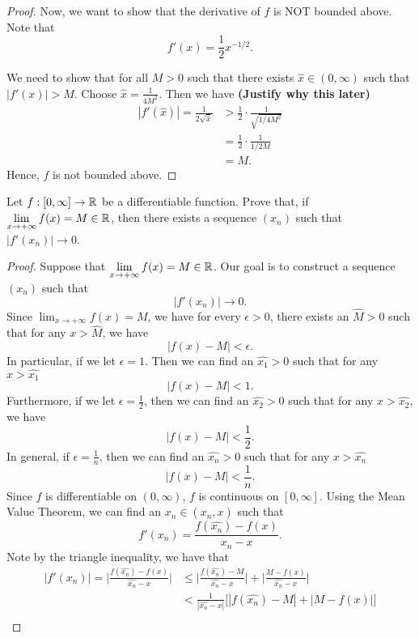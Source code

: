 \documentclass[a4paper]{article}
\begin{document}
\begin{proof}
        Now, we want to show that the derivative of \( f  \) is NOT bounded above. Note that 
        \[  f'(x) = \frac{ 1 }{ 2 }  x^{-1/2}. \]
        
        We need to show that for all \( M > 0  \) such that there exists \( \hat{x} \in (0,\infty ) \) such that \( | f'(x) |  > M  \). Choose \( \hat{x} = \frac{ 1 }{ 4 M^{2} }  \). Then we have  \textbf{(Justify why this later)} 
        \begin{align*}
            | f'(\hat{x}) | = \frac{ 1 }{ 2 \sqrt{ \hat{x} }  } &> \frac{ 1 }{ 2 }  \cdot \frac{ 1  }{  \sqrt{  1/4 M^{2} }  }  \\
                                                                &= \frac{ 1 }{ 2 } \cdot \frac{ 1 }{ 1/2M } \\ 
                                                                &= M.
        \end{align*}
        Hence, \( f  \) is not bounded above.
\end{proof}

\begin{problem}
    Let \( f: [0,\infty ] \to \mathbb{R} \) be a differentiable function. Prove that, if \( \lim_{ x \to  + \infty   }  f(x) = M  \in \R  \), then there exists a sequence \( ({x}_{n}) \) such that \( | f'({x}_{n}) | \to 0 \).
\end{problem}
\begin{proof}
Suppose that \( \lim_{ x \to + \infty   }  f(x) = M  \in \R  \). Our goal is to construct a sequence \( ({x}_{n}) \) such that 
\[  | f'({x}_{n}) | \to 0. \]
Since \( \lim_{ x \to + \infty   }  f(x) = M   \), we have for every \( \epsilon > 0  \), there exists an \( \hat{M} > 0   \) such that for any \( x > \hat{M}  \), we have
\[  | f(x) - M  | < \epsilon.  \]
In particular, if we let \( \epsilon = 1  \). Then we can find an \( \hat{{x}_{1}} > 0  \) such that for any \( x > \hat{{x}_{1}} \)
\[  | f(x) - M  | < 1. \] 
Furthermore, if we let \( \epsilon = \frac{ 1 }{ 2 }  \), then we can find an \( \hat{{x}_{2}} > 0  \) such that for any \( x > \hat{{x}_{2}} \), we have 
\[  | f(x) - M  | < \frac{ 1 }{ 2 }. \]
In general, if \( \epsilon = \frac{ 1 }{ n }  \), then we can find an \( \hat{{x}_{n}} > 0  \) such that for any \( x > \hat{{x}_{n}} \)
\[ | f(x) - M  | < \frac{ 1 }{ n }.   \] 
Since \( f  \) is differentiable on \( (0,\infty ) \), \( f  \) is continuous on \( [ 0,\infty ] \). Using the Mean Value Theorem, we can find an \( {x}_{n} \in (\hat{{x}_{n}}, x) \) such that  
\[  f'({x}_{n}) = \frac{ f(\hat{{x}_{n}}) - f(x) }{ \hat{{x}_{n}} - x   }.  \]
Note by the triangle inequality, we have that 
\begin{align*}
    | f'({x}_{n}) | = \Big| \frac{ f(\hat{{x}_{n}}) - f(x) }{ \hat{{x}_{n}} - x  }  \Big|  
                    &\leq \Big| \frac{ f(\hat{{x}_{n}}) - M  }{ \hat{{x}_{n}} - x   }  \Big| + \Big|  \frac{M - f(x)}{ \hat{{x}_{n}} - x  }  \Big| \\
                    &< \frac{ 1 }{ | \hat{{x}_{n}} - x  |  } \Big[ | f(\hat{{x}_{n}}) - M  | + | M - f(x) |  \Big] \\
\end{align*}
\end{proof}
\end{document}
